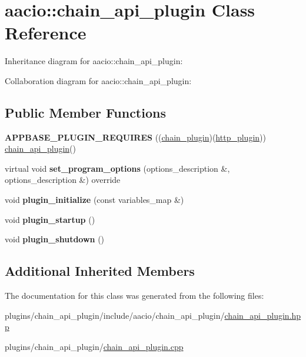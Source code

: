 \hypertarget{classaacio_1_1chain__api__plugin}{}\section{aacio\+:\+:chain\+\_\+api\+\_\+plugin Class Reference}
\label{classaacio_1_1chain__api__plugin}


Inheritance diagram for aacio\+:\+:chain\+\_\+api\+\_\+plugin\+:


Collaboration diagram for aacio\+:\+:chain\+\_\+api\+\_\+plugin\+:
\subsection*{Public Member Functions}
\begin{DoxyCompactItemize}
\item 
\mbox{\label{classaacio_1_1chain__api__plugin_a53bf069a668c325eb90fe128cec40a9f}} 
{\bfseries A\+P\+P\+B\+A\+S\+E\+\_\+\+P\+L\+U\+G\+I\+N\+\_\+\+R\+E\+Q\+U\+I\+R\+ES} ((\mbox{\hyperlink{classaacio_1_1chain__plugin}{chain\+\_\+plugin}})(\mbox{\hyperlink{classaacio_1_1http__plugin}{http\+\_\+plugin}})) \mbox{\hyperlink{classaacio_1_1chain__api__plugin}{chain\+\_\+api\+\_\+plugin}}()
\item 
\mbox{\label{classaacio_1_1chain__api__plugin_a6e282b68d9a759240710a29d68a80de3}} 
virtual void {\bfseries set\+\_\+program\+\_\+options} (options\+\_\+description \&, options\+\_\+description \&) override
\item 
\mbox{\label{classaacio_1_1chain__api__plugin_a1e184eb1e6f8e7c6324dca37a7005ce5}} 
void {\bfseries plugin\+\_\+initialize} (const variables\+\_\+map \&)
\item 
\mbox{\label{classaacio_1_1chain__api__plugin_a21f620bb483e8ab35adb923f19c19c11}} 
void {\bfseries plugin\+\_\+startup} ()
\item 
\mbox{\label{classaacio_1_1chain__api__plugin_a747dd21316f0c06e955b64cc9e37484f}} 
void {\bfseries plugin\+\_\+shutdown} ()
\end{DoxyCompactItemize}
\subsection*{Additional Inherited Members}


The documentation for this class was generated from the following files\+:\begin{DoxyCompactItemize}
\item 
plugins/chain\+\_\+api\+\_\+plugin/include/aacio/chain\+\_\+api\+\_\+plugin/\mbox{\hyperlink{chain__api__plugin_8hpp}{chain\+\_\+api\+\_\+plugin.\+hpp}}\item 
plugins/chain\+\_\+api\+\_\+plugin/\mbox{\hyperlink{chain__api__plugin_8cpp}{chain\+\_\+api\+\_\+plugin.\+cpp}}\end{DoxyCompactItemize}
